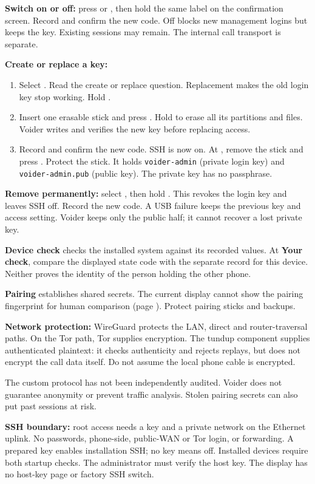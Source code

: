 \textbf{Switch on or off:} press  or , then hold the same label on the confirmation screen. Record and confirm the new code. Off blocks new management logins but keeps the key. Existing sessions may remain. The internal call transport is separate.

\textbf{Create or replace a key:}
\begin{enumerate}
\item Select . Read the create or replace question. Replacement makes the old login key stop working. Hold .
\item Insert one erasable stick and press . Hold  to erase all its partitions and files. Voider writes and verifies the new key before replacing access.
\item Record and confirm the new code. SSH is now on. At , remove the stick and press . Protect the stick. It holds \texttt{voider-admin} (private login key) and \texttt{voider-admin.pub} (public key). The private key has no passphrase.
\end{enumerate}
\textbf{Remove permanently:} select , then hold . This revokes the login key and leaves SSH off. Record the new code. A USB failure keeps the previous key and access setting. Voider keeps only the public half; it cannot recover a lost private key.

\textbf{Device check} checks the installed system against its recorded values. At \textbf{Your check}, compare the displayed state code with the separate record for this device. Neither proves the identity of the person holding the other phone.

\textbf{Pairing} establishes shared secrets. The current display cannot show the pairing fingerprint for human comparison (page \pageref{en:add}). Protect pairing sticks and backups.

\textbf{Network protection:} WireGuard protects the LAN, direct and router-traversal paths. On the Tor path, Tor supplies encryption. The tundup component supplies authenticated plaintext: it checks authenticity and rejects replays, but does not encrypt the call data itself. Do not assume the local phone cable is encrypted.

The custom protocol has not been independently audited. Voider does not guarantee anonymity or prevent traffic analysis. Stolen pairing secrets can also put past sessions at risk.

\textbf{SSH boundary:} root access needs a key and a private network on the Ethernet uplink. No passwords, phone-side, public-WAN or Tor login, or forwarding. A prepared key enables installation SSH; no key means off. Installed devices require both startup checks. The administrator must verify the host key. The display has no host-key page or factory SSH switch.

